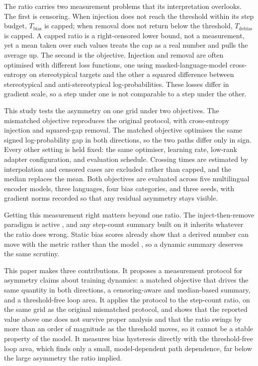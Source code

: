 \documentclass[Afour,sageh,times]{sagej}
\begin{document}
The ratio carries two measurement problems that its interpretation overlooks. The first is censoring. When injection does not reach the threshold within its step budget, $T_{\mathrm{bias}}$ is capped; when removal does not return below the threshold, $T_{\mathrm{debias}}$ is capped. A capped ratio is a right-censored lower bound, not a measurement, yet a mean taken over such values treats the cap as a real number and pulls the average up. The second is the objective. Injection and removal are often optimised with different loss functions, one using masked-language-model cross-entropy on stereotypical targets and the other a squared difference between stereotypical and anti-stereotypical log-probabilities. These losses differ in gradient scale, so a step under one is not comparable to a step under the other.

This study tests the asymmetry on one grid under two objectives. The mismatched objective reproduces the original protocol, with cross-entropy injection and squared-gap removal. The matched objective optimises the same signed log-probability gap in both directions, so the two paths differ only in sign. Every other setting is held fixed: the same optimiser, learning rate, low-rank adapter configuration, and evaluation schedule. Crossing times are estimated by interpolation and censored cases are excluded rather than capped, and the median replaces the mean. Both objectives are evaluated across five multilingual encoder models, three languages, four bias categories, and three seeds, with gradient norms recorded so that any residual asymmetry stays visible.

Getting this measurement right matters beyond one ratio. The inject-then-remove paradigm is active \citep{islam2025biasgym, liu2025rethinking}, and any step-count summary built on it inherits whatever the ratio does wrong. Static bias scores already show that a derived number can move with the metric rather than the model \citep{goldfarbtarrant2021intrinsic}, so a dynamic summary deserves the same scrutiny.

This paper makes three contributions. It proposes a measurement protocol for asymmetry claims about training dynamics: a matched objective that drives the same quantity in both directions, a censoring-aware and median-based summary, and a threshold-free loop area. It applies the protocol to the step-count ratio, on the same grid as the original mismatched protocol, and shows that the reported value above one does not survive proper analysis and that the ratio swings by more than an order of magnitude as the threshold moves, so it cannot be a stable property of the model. It measures bias hysteresis directly with the threshold-free loop area, which finds only a small, model-dependent path dependence, far below the large asymmetry the ratio implied.
\end{document}

